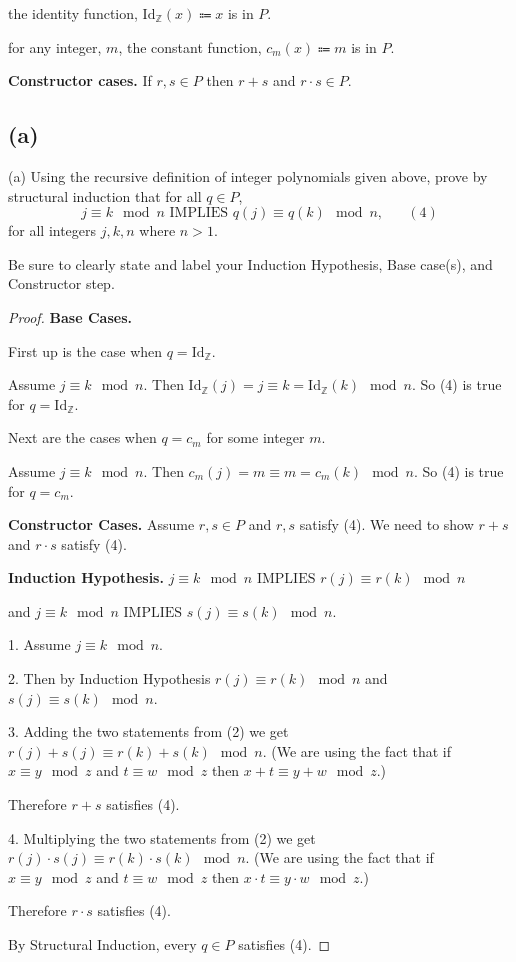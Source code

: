 \documentclass[14pt]{extarticle}
\begin{document}
the identity function, $\text{Id}_\mathbb{Z}(x) \Coloneqq x$ is in $P$.

for any integer, $m$, the constant function, $c_m(x) \Coloneqq m$ is in $P$.

{\bf Constructor cases.} If $r, s \in P$ then $r + s$ and $r \cdot s \in P$.
\subsection{(a)}
(a) Using the recursive definition of integer polynomials given above, prove by structural induction that for all $q \in P$,
$$
j \equiv k \mod n \text{ IMPLIES } q(j) \equiv q(k) \mod n,\,\,\,\,\,\,\,\,\,\,(4)
$$
for all integers $j, k, n$ where $n > 1$.

Be sure to clearly state and label your Induction Hypothesis, Base case(s), and Constructor step.
\begin{proof}
{\bf Base Cases.}

First up is the case when $q = \text{Id}_{\mathbb{Z}}$.

Assume $j \equiv k \mod n$. Then $\text{Id}_{\mathbb{Z}}(j) = j \equiv k = \text{Id}_{\mathbb{Z}}(k) \mod n$. So (4) is true for $q = \text{Id}_{\mathbb{Z}}$.

Next are the cases when $q = c_m$ for some integer $m$.

Assume $j \equiv k \mod n$. Then $c_m(j) = m \equiv m = c_m(k) \mod n$. So (4) is true for $q = c_m$.

{\bf Constructor Cases.} Assume $r, s \in P$ and $r, s$ satisfy (4). We need to show $r + s$ and $r \cdot s$ satisfy (4).

{\bf Induction Hypothesis.} $j \equiv k \mod n \text{ IMPLIES } r(j) \equiv r(k) \mod n$ 

and $j \equiv k \mod n \text{ IMPLIES } s(j) \equiv s(k) \mod n$.

1. Assume $j \equiv k \mod n$. 

2. Then by Induction Hypothesis $r(j) \equiv r(k) \mod n$ and $s(j) \equiv s(k) \mod n$.

3. Adding the two statements from (2) we get $r(j) + s(j) \equiv r(k) + s(k) \mod n$. (We are using the fact that if $x \equiv y \mod z$ and $t \equiv w \mod z$ then $x + t \equiv y + w \mod z$.)

Therefore $r + s$ satisfies (4).

4. Multiplying the two statements from (2) we get $r(j) \cdot s(j) \equiv r(k) \cdot s(k) \mod n$. (We are using the fact that if $x \equiv y \mod z$ and $t \equiv w \mod z$ then $x \cdot t \equiv y \cdot w \mod z$.)

Therefore $r \cdot s$ satisfies (4).

By Structural Induction, every $q \in P$ satisfies (4).
\end{proof}
\end{document}
